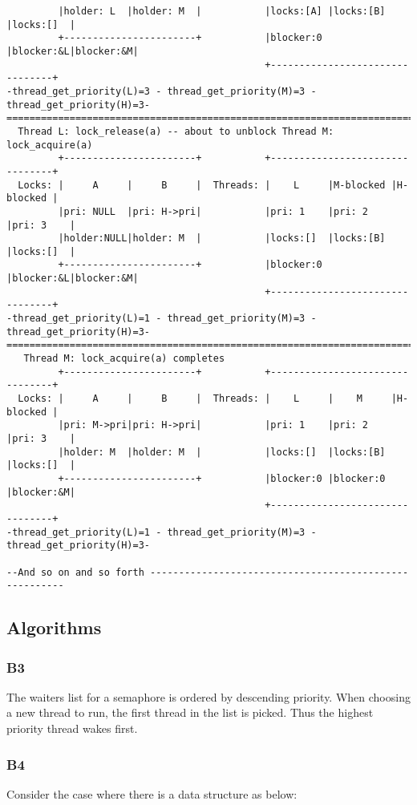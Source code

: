 \documentclass[a4wide, 11pt]{article}
\begin{document}
\begin{verbatim}
         |holder: L  |holder: M  |           |locks:[A] |locks:[B] |locks:[]  |
         +-----------------------+           |blocker:0 |blocker:&L|blocker:&M|
                                             +--------------------------------+
-thread_get_priority(L)=3 - thread_get_priority(M)=3 - thread_get_priority(H)=3-
================================================================================
  Thread L: lock_release(a) -- about to unblock Thread M: lock_acquire(a) 
         +-----------------------+           +--------------------------------+
  Locks: |     A     |     B     |  Threads: |    L     |M-blocked |H-blocked |
         |pri: NULL  |pri: H->pri|           |pri: 1    |pri: 2    |pri: 3    |
         |holder:NULL|holder: M  |           |locks:[]  |locks:[B] |locks:[]  |
         +-----------------------+           |blocker:0 |blocker:&L|blocker:&M|
                                             +--------------------------------+
-thread_get_priority(L)=1 - thread_get_priority(M)=3 - thread_get_priority(H)=3-
================================================================================
   Thread M: lock_acquire(a) completes
         +-----------------------+           +--------------------------------+
  Locks: |     A     |     B     |  Threads: |    L     |    M     |H-blocked |
         |pri: M->pri|pri: H->pri|           |pri: 1    |pri: 2    |pri: 3    |
         |holder: M  |holder: M  |           |locks:[]  |locks:[B] |locks:[]  |
         +-----------------------+           |blocker:0 |blocker:0 |blocker:&M|
                                             +--------------------------------+
-thread_get_priority(L)=1 - thread_get_priority(M)=3 - thread_get_priority(H)=3-

--And so on and so forth -------------------------------------------------------
\end{verbatim}

\subsection{Algorithms}
\subsubsection{B3}
The waiters list for a semaphore is ordered by descending priority. When choosing a new thread to run, the first thread in the list is picked. Thus the highest priority thread wakes first.
\subsubsection{B4}
Consider the case where there is a data structure as below:
\end{document}

